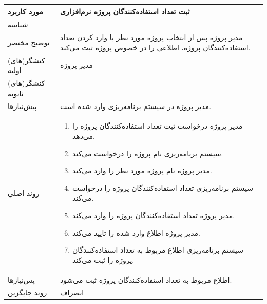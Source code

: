 \begin{table}[H]
	\centering
	\begin{tabular}{|p{3cm}|p{10cm}|}
		\hline
		
		
		مورد کاربرد	& ثبت تعداد استفاده‌کنندگان پروژه نرم‌افزاری  \\
		\hline
		
		شناسه & 
		\stepcounter{usecase_ID}
		
		\arabic{usecase_ID} \\
		
		\hline
		
		توضیح مختصر & مدیر پروژه پس از انتخاب پروژه مورد نظر با وارد کردن تعداد استفاده‌کنندگان پروژه، اطلاعی را در خصوص پروژه ثبت می‌کند. \\
		\hline
		
		کنشگر(های) اولیه& مدیر پروژه \\
		\hline
		
		کنشگر(های) ثانویه&  \\
		\hline
		
		پیش‌نیازها
		& مدیر پروژه در سیستم برنامه‌ریزی وارد شده است.\\		
		\hline
		
		
		روند اصلی &
		\begin{enumerate}[topsep=0cm,leftmargin=0.5cm]
			\item مدیر پروژه درخواست ثبت تعداد استفاده‌کنندگان پروژه را می‌دهد.
			\item سیستم برنامه‌ریزی نام پروژه را درخواست می‌کند.
			\item مدیر پروژه نام پروژه مورد نظر را وارد می‌کند.
			\item سیستم برنامه‌ریزی تعداد استفاده‌کنندگان پروژه را درخواست می‌کند.
			\item مدیر پروژه تعداد استفاده‌کنندگان پروژه را وارد می‌کند.
			\item مدیر پروژه اطلاع وارد شده را تایید می‌کند.
			\item سیستم برنامه‌ریزی اطلاع مربوط به تعداد استفاده‌کنندگان پروژه را ثبت می‌کند.
		\end{enumerate}\\
		
		\hline
		
		پس‌نیازها &
		اطلاع مربوط به تعداد استفاده‌کنندگان پروژه ثبت می‌شود. \\
		\hline
		
		روند جایگزین
		& انصراف \\
		\hline
		
	\end{tabular}
\end{table}
